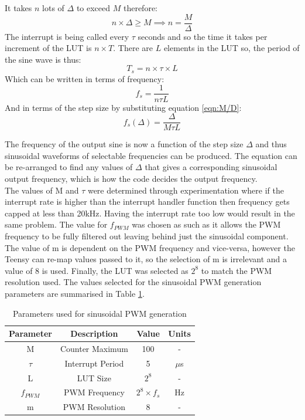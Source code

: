 It takes $n$ lots of $\Delta$ to exceed $M$ therefore:
\begin{equation}
	n\times\Delta \ge M \implies n = \frac{M}{\Delta}
	\label{eqn:M/D}
\end{equation}
The interrupt is being called every $\tau$ seconds and so the time it takes per increment of the LUT is $n\times T$. There are $L$ elements in the LUT so, the period of the sine wave is thus:
\begin{equation}
	T_s = n\times \tau\times L
\end{equation}
Which can be written in terms of frequency:
\begin{equation}
	f_s = \frac{1}{n\tau L}
\end{equation}
And in terms of the step size by substituting equation \ref{eqn:M/D}:
\begin{equation}
	f_s(\Delta) = \frac{\Delta}{M\tau L}
\end{equation}

The frequency of the output sine is now a function of the step size $\Delta$ and thus sinusoidal waveforms of selectable frequencies can be produced. The equation can be re-arranged to find any values of $\Delta$ that gives a corresponding sinusoidal output frequency, which is how the code decides the output frequency. \\

The values of M and $\tau$ were determined through experimentation where if the interrupt rate is higher than the  interrupt handler function then frequency gets capped at less than 20kHz. Having the interrupt rate too low would result in the same problem. The value for $f_{PWM}$ was chosen as such as it allows the PWM frequency to be fully filtered out leaving behind just the sinusoidal component. The value of m is dependent on the PWM frequency and vice-versa, however the Teensy can re-map values passed to it, so the selection of m is irrelevant and a value of 8 is used. Finally, the LUT was selected as $2^8$ to match the PWM resolution used. The values selected for the sinusoidal PWM generation parameters are summarised in Table \ref{tab:L_sinusoidalPWM}.\\
\begin{table} [!htb]
	\caption{Parameters used for sinusoidal PWM generation}
	\label{tab:L_sinusoidalPWM}
	\centering
	\begin{tabular}{ |c|c|c|c| }
		\hline
		Parameter & Description & Value & Units \\ 
		\hline
		M & Counter Maximum & 100 & - \\ 
		$\tau$ & Interrupt Period & 5 & $\mu$s \\ 
		L & LUT Size & $2^8$ & - \\
		$f_{PWM}$ & PWM Frequency & $2^8\times f_s$ & Hz\\
		m & PWM Resolution & 8 & - \\
		\hline
	\end{tabular}
\end{table}

